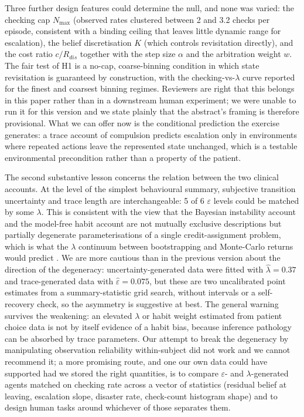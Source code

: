 \documentclass[11pt,a4paper]{article}
\begin{document}
Three further design features could determine the null, and none was varied: the checking cap $N_{\max}$ (observed rates clustered between 2 and 3.2 checks per episode, consistent with a binding ceiling that leaves little dynamic range for escalation), the belief discretisation $K$ (which controls revisitation directly), and the cost ratio $c/R_{dis}$ together with the step size $\alpha$ and the arbitration weight $w$. The fair test of H1 is a no-cap, coarse-binning condition in which state revisitation is guaranteed by construction, with the checking-vs-$\lambda$ curve reported for the finest and coarsest binning regimes. Reviewers are right that this belongs in this paper rather than in a downstream human experiment; we were unable to run it for this version and we state plainly that the abstract's framing is therefore provisional. What we can offer now is the conditional prediction the exercise generates: a trace account of compulsion predicts escalation only in environments where repeated actions leave the represented state unchanged, which is a testable environmental precondition rather than a property of the patient.

The second substantive lesson concerns the relation between the two clinical accounts. At the level of the simplest behavioural summary, subjective transition uncertainty and trace length are interchangeable: 5 of 6 $\varepsilon$ levels could be matched by some $\lambda$. This is consistent with the view that the Bayesian instability account \citep{fradkin2020searching} and the model-free habit account \citep{voon2014disorders} are not mutually exclusive descriptions but partially degenerate parameterisations of a single credit-assignment problem, which is what the $\lambda$ continuum between bootstrapping and Monte-Carlo returns would predict \citep{precup2000eligibility,moerland2023modelbased}. We are more cautious than in the previous version about the direction of the degeneracy: uncertainty-generated data were fitted with $\hat{\lambda} = 0.37$ and trace-generated data with $\hat{\varepsilon} = 0.075$, but these are two uncalibrated point estimates from a summary-statistic grid search, without intervals or a self-recovery check, so the asymmetry is suggestive at best. The general warning survives the weakening: an elevated $\lambda$ or habit weight estimated from patient choice data is not by itself evidence of a habit bias, because inference pathology can be absorbed by trace parameters. Our attempt to break the degeneracy by manipulating observation reliability within-subject did not work and we cannot recommend it; a more promising route, and one our own data could have supported had we stored the right quantities, is to compare $\varepsilon$- and $\lambda$-generated agents matched on checking rate across a vector of statistics (residual belief at leaving, escalation slope, disaster rate, check-count histogram shape) and to design human tasks around whichever of those separates them.
\end{document}
